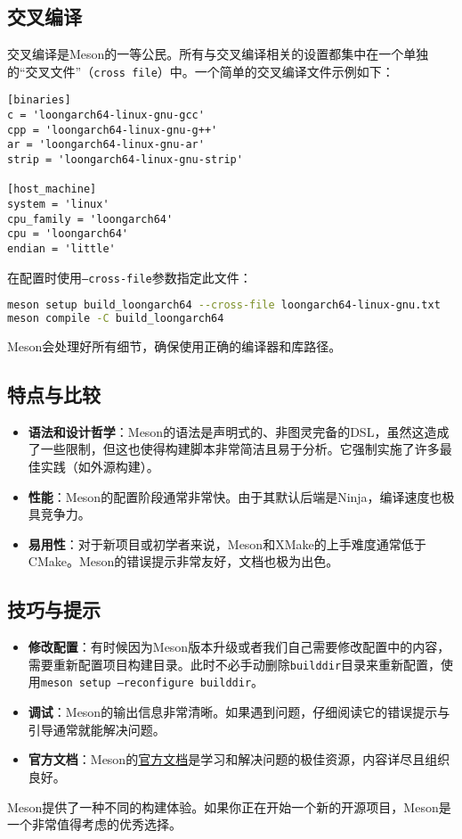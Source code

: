 \documentclass[../main.tex]{subfiles}
\begin{document}
\subsection{交叉编译}
交叉编译是Meson的一等公民。所有与交叉编译相关的设置都集中在一个单独的“交叉文件”（\texttt{cross file}）中。一个简单的交叉编译文件示例如下：
\begin{lstlisting}
[binaries]
c = 'loongarch64-linux-gnu-gcc'
cpp = 'loongarch64-linux-gnu-g++'
ar = 'loongarch64-linux-gnu-ar'
strip = 'loongarch64-linux-gnu-strip'

[host_machine]
system = 'linux'
cpu_family = 'loongarch64'
cpu = 'loongarch64'
endian = 'little'
\end{lstlisting}

在配置时使用\texttt{--cross-file}参数指定此文件：
\begin{lstlisting}[language=bash]
meson setup build_loongarch64 --cross-file loongarch64-linux-gnu.txt
meson compile -C build_loongarch64
\end{lstlisting}
Meson会处理好所有细节，确保使用正确的编译器和库路径。

\subsection{特点与比较}
\begin{itemize}
  \item \textbf{语法和设计哲学}：Meson的语法是声明式的、非图灵完备的DSL，虽然这造成了一些限制，但这也使得构建脚本非常简洁且易于分析。它强制实施了许多最佳实践（如外源构建）。
  \item \textbf{性能}：Meson的配置阶段通常非常快。由于其默认后端是Ninja，编译速度也极具竞争力。
  \item \textbf{易用性}：对于新项目或初学者来说，Meson和XMake的上手难度通常低于CMake。Meson的错误提示非常友好，文档也极为出色。
\end{itemize}

\subsection{技巧与提示}
\begin{itemize}
  \item \textbf{修改配置}：有时候因为Meson版本升级或者我们自己需要修改配置中的内容，需要重新配置项目构建目录。此时不必手动删除\texttt{builddir}目录来重新配置，使用\texttt{meson setup --reconfigure builddir}。
  \item \textbf{调试}：Meson的输出信息非常清晰。如果遇到问题，仔细阅读它的错误提示与引导通常就能解决问题。
  \item \textbf{官方文档}：Meson的\href{https://mesonbuild.com/}{官方文档}是学习和解决问题的极佳资源，内容详尽且组织良好。
\end{itemize}

Meson提供了一种不同的构建体验。如果你正在开始一个新的开源项目，Meson是一个非常值得考虑的优秀选择。
\end{document}
